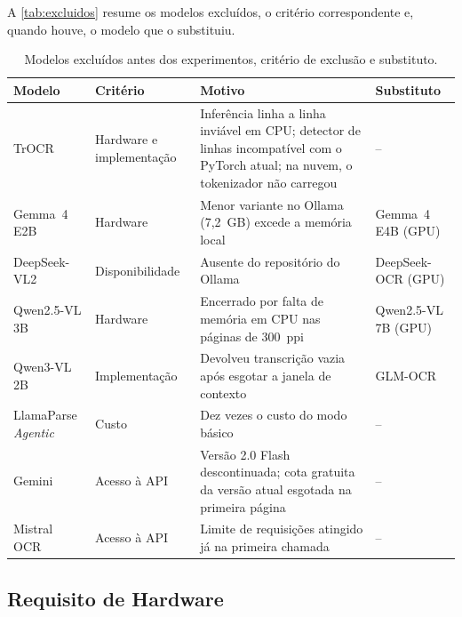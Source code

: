 \documentclass[noabntexcite,oneside]{ufsc-thesis-rn46-2019}
\begin{document}
A \autoref{tab:excluidos} resume os modelos excluídos, o critério correspondente e,
quando houve, o modelo que o substituiu.

\begin{table}[htb]
\centering
\caption{Modelos excluídos antes dos experimentos, critério de exclusão e substituto.}
\label{tab:excluidos}
\renewcommand{\arraystretch}{1.3}
{\small
\begin{tabular}{L{3.0cm} L{2.4cm} L{6.0cm} L{2.6cm}}
\hline
\textbf{Modelo} & \textbf{Critério} & \textbf{Motivo} & \textbf{Substituto} \\
\hline
TrOCR & Hardware e implementação & Inferência linha a linha inviável em CPU; detector de
  linhas incompatível com o PyTorch atual; na nuvem, o tokenizador não carregou & -- \\
Gemma~4 E2B & Hardware & Menor variante no Ollama (7,2~GB) excede a memória local
  & Gemma~4 E4B (GPU) \\
DeepSeek-VL2 & Disponibilidade & Ausente do repositório do Ollama & DeepSeek-OCR (GPU) \\
Qwen2.5-VL 3B & Hardware & Encerrado por falta de memória em CPU nas páginas de 300~ppi
  & Qwen2.5-VL 7B (GPU) \\
Qwen3-VL 2B & Implementação & Devolveu transcrição vazia após esgotar a janela de
  contexto & GLM-OCR \\
LlamaParse \textit{Agentic} & Custo & Dez vezes o custo do modo básico & -- \\
Gemini & Acesso à API & Versão 2.0 Flash descontinuada; cota gratuita da versão atual
  esgotada na primeira página & -- \\
Mistral OCR & Acesso à API & Limite de requisições atingido já na primeira chamada & -- \\
\hline
\end{tabular}
}
\end{table}

\subsection{Requisito de Hardware}
\end{document}
